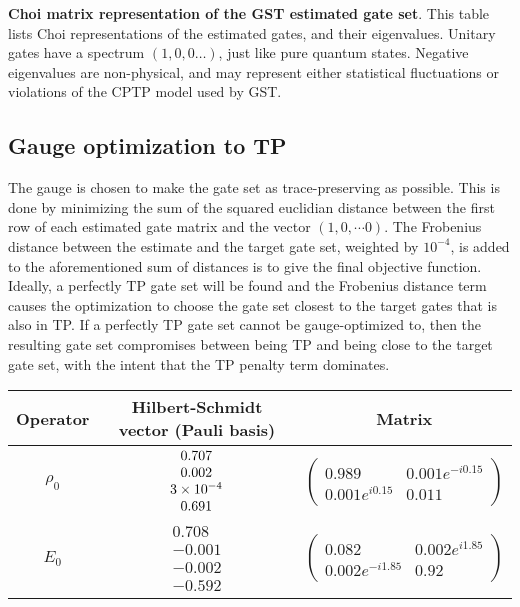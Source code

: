 {\begin{table}[h]
\begin{center}
\caption{\textbf{Choi matrix representation of the GST estimated gate set}.  This table lists Choi representations of the estimated gates, and their eigenvalues.  Unitary gates have a spectrum $(1,0,0\ldots)$, just like pure quantum states.  Negative eigenvalues are non-physical, and may represent either statistical fluctuations or violations of the CPTP model used by GST.\label{bestTargetGatesGatesetChoiTable}}
\end{center}
\end{table}

\clearpage

\subsection{Gauge optimization to TP}
The gauge is chosen to make the gate set as trace-preserving as possible.  This is done by minimizing the sum of the squared euclidian distance between the first row of each estimated gate matrix and the vector $(1,0,\cdots 0)$.  The Frobenius distance between the estimate and the target gate set, weighted by $10^{-4}$, is added to the aforementioned sum of distances is to give the final objective function.  Ideally, a perfectly TP gate set will be found and the Frobenius distance term causes the optimization to choose the gate set closest to the target gates that is also in TP.  If a perfectly TP gate set cannot be gauge-optimized to, then the resulting gate set compromises between being TP and being close to the target gate set, with the intent that the TP penalty term dominates.

\begin{table}[h]
\begin{center}
\begin{tabular}[l]{|c|c|c|}
\hline
Operator & Hilbert-Schmidt vector (Pauli basis) & Matrix \\ \hline
$\rho_{0}$ & $ \begin{array}{c}
0.707 \\ 
0.002 \\ 
3\times 10^{-4} \\ 
0.691
 \end{array} $
 & $ \left(\!\!\begin{array}{cc}
0.989 & 0.001e^{-i0.15} \\ 
0.001e^{i0.15} & 0.011
 \end{array}\!\!\right) $
 \\ \hline
$E_{0}$ & $ \begin{array}{c}
0.708 \\ 
-0.001 \\ 
-0.002 \\ 
-0.592
 \end{array} $
 & $ \left(\!\!\begin{array}{cc}
0.082 & 0.002e^{i1.85} \\ 
0.002e^{-i1.85} & 0.92
 \end{array}\!\!\right) $
 \\ \hline
\end{tabular}


\end{center}
\end{table}}
